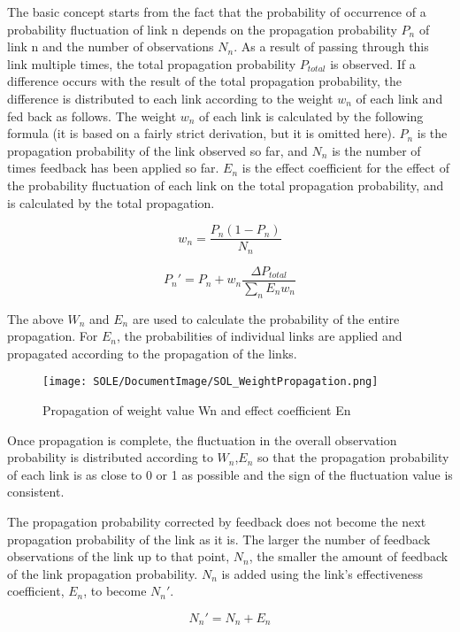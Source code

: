\documentclass[12pt]{article}
\begin{document}
The basic concept starts from the fact that the probability of
occurrence of a probability fluctuation of link n depends on the
propagation probability \(P_n\) of link n and the number of observations
\(N_n\). As a result of passing through this link multiple times, the
total propagation probability \(P_{total}\) is observed. If a difference
occurs with the result of the total propagation probability, the
difference is distributed to each link according to the weight \(w_n\)
of each link and fed back as follows. The weight \(w_n\) of each link is
calculated by the following formula (it is based on a fairly strict
derivation, but it is omitted here). \(P_n\) is the propagation
probability of the link observed so far, and \(N_n\) is the number of
times feedback has been applied so far. \(E_n\) is the effect
coefficient for the effect of the probability fluctuation of each link
on the total propagation probability, and is calculated by the total
propagation.

\[  w_n=\frac{P_n(1-P_n)}{N_n} \]

\[P_n'=P_n+ w_n\frac{\Delta P_{total}}{ \sum_n E_n w_n} \]

The above \(W_n\) and \(E_n\) are used to calculate the probability of
the entire propagation. For \(E_n\), the probabilities of individual
links are applied and propagated according to the propagation of the
links.

\begin{figure}[ht]
  \centering
  \texttt{[image: SOLE/DocumentImage/SOL\_WeightPropagation.png]}
  \caption{Propagation of weight value Wn and effect coefficient En}
  \label{fig:propagation_of_weight_value_wn_and_effect_coefficient_en}
\end{figure}

Once propagation is complete, the fluctuation in the overall observation
probability is distributed according to \(W_n\),\(E_n\) so that the
propagation probability of each link is as close to 0 or 1 as possible
and the sign of the fluctuation value is consistent.

The propagation probability corrected by feedback does not become the
next propagation probability of the link as it is. The larger the number
of feedback observations of the link up to that point, \(N_{n}\), the
smaller the amount of feedback of the link propagation probability.
\(N_{n}\) is added using the link's effectiveness coefficient, \(E_n\),
to become \(N_{n}'\).

\[ N_{n}'=N_{n}+E_n\]
\end{document}
